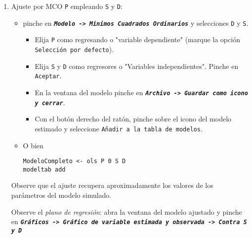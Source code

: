 \documentclass[11pt]{article}
\begin{document}
\begin{enumerate}
\item Ajuste por MCO \texttt{P} empleando \texttt{S} y \texttt{D}:

\begin{itemize}
\item pinche en \textbf{\emph{\texttt{Modelo -> Mínimos Cuadrados Ordinarios}}} y selecciones \texttt{D} y \texttt{S}.

\begin{itemize}
\item Elija \texttt{P} como regresando o "variable dependiente" (marque la opción \texttt{Selección por defecto}).

\item Elija \texttt{S} y \texttt{D} como regresores o "Variables independientes". Pinche en \texttt{Aceptar}.

\item En la ventana del modelo pinche en \textbf{\emph{\texttt{Archivo -> Guardar como icono y cerrar}}}.

\item Con el botón derecho del ratón, pinche sobre el icono del
modelo estimado y seleccione \texttt{Añadir a la tabla de modelos}.
\end{itemize}

\item O bien 
\begin{verbatim}
ModeloCompleto <- ols P 0 S D
modeltab add
\end{verbatim}
\end{itemize}

Observe que el ajuste recupera aproximadamente los valores de los
parámetros del modelo simulado.

Observe el \emph{plano de regresión}: abra la ventana del modelo
ajustado y pinche en \textbf{\emph{\texttt{Gráficos -> Gráfico de variable estimada y
   observada -> Contra S y D}}}
\end{enumerate}
\end{document}
